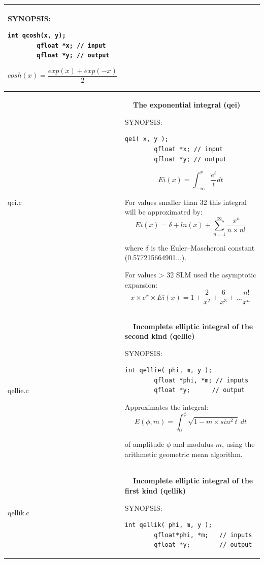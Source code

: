\documentclass[10pt,a4paper,x11names]{memoir} %
\newcounter{entry}
\newcommand{\TOC}[1] {\addcontentsline{toc}{section}{\theentry\ \  #1} \textbf{\theentry\ \  #1} \par\stepcounter{entry}}
\begin{document}
\begin{longtable}{|p{1.5cm}|p{11.5cm}|}
	{\footnotesize SYNOPSIS:}\vspace{-0.2cm}
	\begin{lstlisting}[numbers=none]
		int qcosh(x, y);
		qfloat *x; // input
		qfloat *y; // output
	\end{lstlisting}\vspace{-0.2cm}
	$$cosh(x)=\frac{exp(x)+exp(-x)}{2}$$
	\\\hline
	qei.c& 	\TOC{The exponential integral (qei)}
	
	{\footnotesize SYNOPSIS:}\vspace{-0.2cm}\index{qei}
	\begin{lstlisting}[numbers=none]
		qei( x, y );
		qfloat *x; // input
		qfloat *y; // output
	\end{lstlisting}\vspace{-0.2cm}
	$$Ei(x) = \int_{-\infty}^{x}\frac{e^t}{t} dt$$
	
	For values smaller than 32 this integral will be approximated by:
	$$Ei(x) = \delta + ln(x) + \sum_{n=1}^{\infty} \frac{x^n}{n \times n!}$$
	
	where $\delta$ is the  Euler–Mascheroni constant (0.577215664901...).
	
	For values > 32 SLM used the asymptotic expansion:
	$$x \times e^x \times Ei(x) = 1+\frac{2}{x^2}+\frac{6}{x^3} + ... \frac{n!}{x^n}$$
	\\\hline
	qellie.c&\TOC{Incomplete elliptic integral of the second kind (qellie)}
	
	{\footnotesize SYNOPSIS:}\vspace{-0.2cm}\index{qellie}
	\begin{lstlisting}[numbers=none]
		int qellie( phi, m, y );
		qfloat *phi, *m; // inputs
		qfloat *y;      // output
	\end{lstlisting}\vspace{-0.2cm}
	 Approximates the integral:
	$$ E(\phi,m) = \int_{0}^{\phi}\sqrt{1-m\times sin^2 \ t}\ dt $$
	
	of amplitude $\phi$ and modulus  $m$, using the arithmetic geometric mean algorithm.
	\\\hline
	qellik.c&\TOC{Incomplete elliptic integral of the first kind (qellik)}\index{qellik}
	{\footnotesize SYNOPSIS:}\vspace{-0.2cm}\index{ellik}
	\begin{lstlisting}[numbers=none]
		int qellik( phi, m, y );
		qfloat*phi, *m;   // inputs
		qfloat *y;        // output
	\end{lstlisting}\vspace{-0.2cm}
	

\end{longtable}
\end{document}
